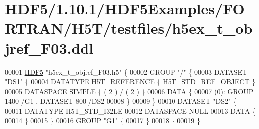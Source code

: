 \hypertarget{_h_d_f5_21_810_81_2_h_d_f5_examples_2_f_o_r_t_r_a_n_2_h5_t_2testfiles_2h5ex__t__objref___f03_8ddl_source}{}\section{H\+D\+F5/1.10.1/\+H\+D\+F5\+Examples/\+F\+O\+R\+T\+R\+A\+N/\+H5\+T/testfiles/h5ex\+\_\+t\+\_\+objref\+\_\+\+F03.ddl}
\label{_h_d_f5_21_810_81_2_h_d_f5_examples_2_f_o_r_t_r_a_n_2_h5_t_2testfiles_2h5ex__t__objref___f03_8ddl_source}

\begin{DoxyCode}
00001 \hyperlink{namespace_h_d_f5}{HDF5} \textcolor{stringliteral}{"h5ex\_t\_objref\_F03.h5"} \{
00002 GROUP \textcolor{stringliteral}{"/"} \{
00003    DATASET \textcolor{stringliteral}{"DS1"} \{
00004       DATATYPE  H5T\_REFERENCE \{ H5T\_STD\_REF\_OBJECT \}
00005       DATASPACE  SIMPLE \{ ( 2 ) / ( 2 ) \}
00006       DATA \{
00007       (0): GROUP 1400 /G1 , DATASET 800 /DS2 
00008       \}
00009    \}
00010    DATASET \textcolor{stringliteral}{"DS2"} \{
00011       DATATYPE  H5T\_STD\_I32LE
00012       DATASPACE  NULL
00013       DATA \{
00014       \}
00015    \}
00016    GROUP \textcolor{stringliteral}{"G1"} \{
00017    \}
00018 \}
00019 \}
\end{DoxyCode}
